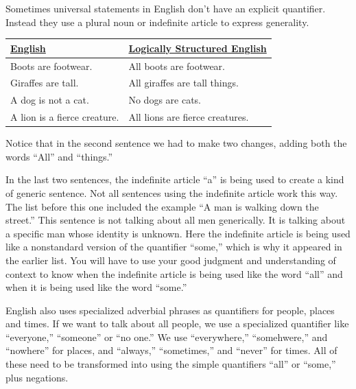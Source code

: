 Sometimes universal statements in English don't have an explicit quantifier. Instead they use a plural noun or indefinite article to express generality.

\begin{longtabu}{p{.5\linewidth}p{.5\linewidth}}
\underline{English} &
\underline{Logically Structured English} \\
\endhead
Boots are footwear. &
All boots are footwear.\\

Giraffes are tall. &
All giraffes are tall things.\\

A dog is not a cat. &
No dogs are cats.\\

A lion is a fierce creature. &
All lions are fierce creatures.\\

\end{longtabu}

\noindent Notice that in the second sentence we had to make two changes, adding both the words ``All'' and ``things.''

In the last two sentences, the indefinite article ``a'' is being used to create a kind of generic sentence. Not all sentences using the indefinite article work this way. The list before this one included the example ``A man is walking down the street.'' This sentence is not talking about all men generically. It is talking about a specific man whose identity is unknown. Here the indefinite article is being used like a nonstandard version of the quantifier ``some,'' which is why it appeared in the earlier list. You will have to use your good judgment and understanding of context to know when the indefinite article is being used like the word ``all'' and when it is being used like the word ``some.''

English also uses specialized adverbial phrases as quantifiers for people, places and times. If we want to talk about all people, we use a specialized quantifier like ``everyone,'' ``someone'' or ``no one.'' We use ``everywhere,'' ``somehwere,'' and ``nowhere'' for places, and ``always,'' ``sometimes,'' and ``never'' for times.  All of these need to be transformed into using the simple quantifiers ``all'' or ``some,'' plus negations.

